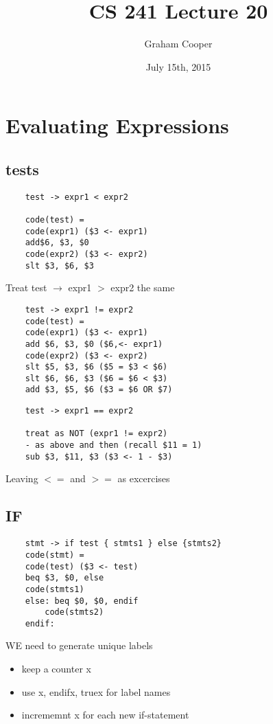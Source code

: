 \documentclass[12pt]{article}
\title{\vspace{-15ex}CS 241 Lecture 20\vspace{-1ex}}
\date{July 15th, 2015}
\author{Graham Cooper}
\begin{document}
	\maketitle
	
	\section*{Evaluating Expressions}
	\subsection*{tests}
	\begin{verbatim}
	test -> expr1 < expr2
	
	code(test) = 
	code(expr1) ($3 <- expr1)
	add$6, $3, $0
	code(expr2) ($3 <- expr2)
	slt $3, $6, $3
	\end{verbatim}
	Treat test $\rightarrow$ expr1 $>$ expr2 the same
	
	\begin{verbatim}
	test -> expr1 != expr2
	code(test) = 
	code(expr1) ($3 <- expr1)
	add $6, $3, $0 ($6,<- expr1)
	code(expr2) ($3 <- expr2)
	slt $5, $3, $6 ($5 = $3 < $6)
	slt $6, $6, $3 ($6 = $6 < $3)
	add $3, $5, $6 ($3 = $6 OR $7)
	\end{verbatim}	
	
	\begin{verbatim}
	test -> expr1 == expr2
	
	treat as NOT (expr1 != expr2)
	- as above and then (recall $11 = 1)
	sub $3, $11, $3 ($3 <- 1 - $3)
	\end{verbatim}
	Leaving $<=$ and $>=$ as excercises
	
	\subsection*{IF}
	\begin{verbatim}
	stmt -> if test { stmts1 } else {stmts2}
	code(stmt) =
	code(test) ($3 <- test)
	beq $3, $0, else
	code(stmts1)
	else: beq $0, $0, endif
		code(stmts2)
	endif:
	\end{verbatim}
	
	WE need to generate unique labels
	\begin{itemize}
		\item keep a counter x
		\item use x, endifx, truex for label names
		\item incrememnt x for each new if-statement
	\end{itemize}
	
\end{document}
